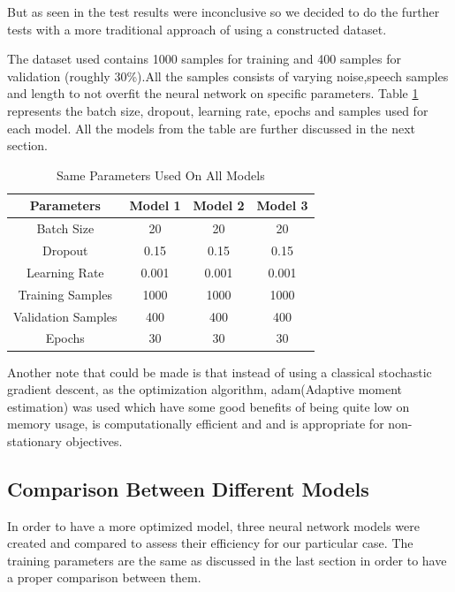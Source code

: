 
But as seen in the test results were inconclusive so we decided to do the further tests with a more traditional approach of using a constructed dataset.


The dataset used contains 1000 samples for training and 400 samples for validation (roughly 30\%).All the samples consists of varying noise,speech samples and length to not overfit the neural network on specific parameters.
Table \ref{tab:firsttable} represents the batch size, dropout, learning rate, epochs and samples used for each model.
All the models from the table are further discussed in the next section.

\begin{table}[htp]
\centering
\begin{tabular}{|c|c|c|c|}
\hline
Parameters         & Model 1 & Model 2 & Model 3 \\ \hline
Batch Size         & 20      & 20      & 20      \\ \hline
Dropout            & 0.15    & 0.15    & 0.15    \\ \hline
Learning Rate      & 0.001   & 0.001   & 0.001   \\ \hline
Training Samples   & 1000    & 1000    & 1000    \\ \hline
Validation Samples & 400     & 400     & 400     \\ \hline
Epochs             & 30      & 30      & 30      \\ \hline
\end{tabular}
\caption{Same Parameters Used On All Models}
\label{tab:firsttable}
\end{table}
Another note that could be made is that instead of using a classical stochastic gradient descent, as the optimization algorithm, adam(Adaptive moment estimation) was used which have some good benefits of being quite low on memory usage, is computationally efficient and and is appropriate for non-stationary objectives.
\subsection{Comparison Between Different Models}

In order to have a more optimized model, three neural network models were created and compared to assess their efficiency for our particular case. The training parameters are the same as discussed  in the last section in order to have a proper comparison between them.


